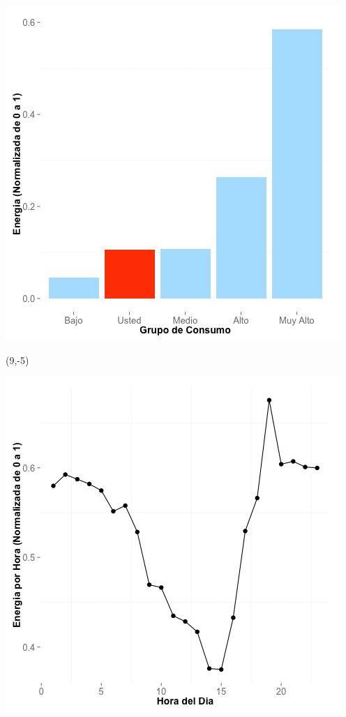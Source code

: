 \documentclass{article}\usepackage[]{graphicx}\usepackage[]{color}
\newenvironment{knitrout}{}{} %
\begin{document}
\begin{knitrout}
\color{fgcolor}
\includegraphics[scale=0.65]{figure/A15_neighbor_plot} 
\end{knitrout}

 \begin{textblock}{1}(9,-5)
\begin{minipage}{20em}
\begingroup

\endgroup
\end{minipage}
\end{textblock}


\begin{knitrout}
\color{fgcolor}
\includegraphics[scale=0.65]{figure/A15_plot_norm_median} 
\end{knitrout}
\end{document}
